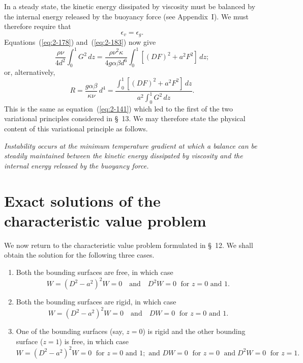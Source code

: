 In a steady state, the kinetic energy dissipated by viscosity must be
balanced by the internal energy released by the buoyancy force (see
Appendix~I). We must therefore require that
\begin{equation}
\label{eq:2-184}
\epsilon_v = \epsilon_g.
\end{equation}
Equations~(\ref{eq:2-178}) and~(\ref{eq:2-183}) now give
\begin{equation}
\label{eq:2-185}
\frac{\rho\nu}{4d^2}\!\int_0^1 G^2\,dz = \frac{\rho\nu^2\kappa}{4g\alpha\beta d^6}\!\int_0^1[(DF)^2+a^2 F^2]\,dz;
\end{equation}
or, alternatively,
\begin{equation}
\label{eq:2-186}
R = \frac{g\alpha\beta}{\kappa\nu}\,d^4 = \frac{\displaystyle\int_0^1[(DF)^2+a^2 F^2]\,dz}{a^2\!\displaystyle\int_0^1 G^2\,dz}.
\end{equation}
This is the same as equation~(\ref{eq:2-141}) which led to the first of the two
variational principles considered in \S~13. We may therefore state the
physical content of this variational principle as follows.

\emph{Instability occurs at the minimum temperature gradient at which a
balance can be steadily maintained between the kinetic energy dissipated
by viscosity and the internal energy released by the buoyancy force.}

\section{Exact solutions of the characteristic value problem}\label{sec:15}

We now return to the characteristic value problem formulated in
\S~12. We shall obtain the solution for the following three cases.

\begin{enumerate}[label=(\alph*)]
\item Both the bounding surfaces are free, in which case
\begin{equation}
\label{eq:2-187}
W = (D^2-a^2)^2 W = 0 \quad\text{and}\quad D^2 W = 0 \;\text{ for } z = 0 \text{ and } 1.
\end{equation}
\item Both the bounding surfaces are rigid, in which case
\begin{equation}
\label{eq:2-188}
W = (D^2-a^2)^2 W = 0 \quad\text{and}\quad DW = 0 \;\text{ for } z = 0 \text{ and } 1.
\end{equation}
\item One of the bounding surfaces (say, $z = 0$) is rigid and the other
bounding surface ($z = 1$) is free, in which case
\begin{equation}
\label{eq:2-189}
W = (D^2-a^2)^2 W = 0 \;\text{ for } z = 0 \text{ and } 1; \text{ and } DW = 0 \;\text{ for } z = 0 \;\text{ and}\;
D^2 W = 0 \;\text{ for } z = 1.
\end{equation}
\end{enumerate}


